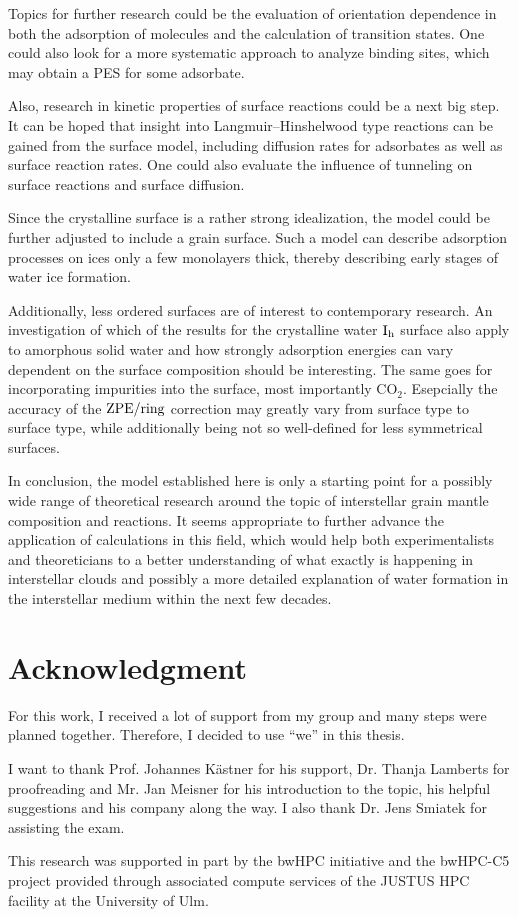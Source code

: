 Topics for further research could be the evaluation of orientation dependence
in both the adsorption of molecules and the calculation of transition states.
One could also look for a more systematic approach to analyze binding sites,
which may obtain a PES for some adsorbate.

Also, research in kinetic properties of surface reactions could be a next big
step. It can be hoped that insight into Langmuir--Hinshelwood type reactions can
be gained from the surface model, including diffusion rates for adsorbates as
well as surface reaction rates. One could also evaluate the influence of
tunneling on surface reactions and surface diffusion.

Since the crystalline surface is a rather strong idealization, the model could
be further adjusted to include a grain surface. Such a model can describe
adsorption processes on ices only a few monolayers thick, thereby describing
early stages of water ice formation.

Additionally, less ordered surfaces are of interest to contemporary research. An
investigation of which of the results for the crystalline water $\text I_\text h$ surface
also apply to amorphous solid water and how strongly adsorption energies can
vary dependent on the surface composition should be interesting. The same goes
for incorporating impurities into the surface, most importantly CO$_2$.
Esepcially the accuracy of the $\text{ZPE}/\text{ring}$ correction may greatly vary from surface type to
surface type, while additionally being not so well-defined for less symmetrical
surfaces.

In conclusion, the model established here is only a starting point for a
possibly wide range of theoretical research around the topic of interstellar
grain mantle composition and reactions. It seems appropriate to further advance
the application of  calculations in this field, which would help
both experimentalists and theoreticians to a better understanding of what
exactly is happening in interstellar clouds and possibly a more detailed
explanation of water formation in the interstellar medium within the next few
decades.

\section*{Acknowledgment}
For this work, I received a lot of support from my group and many steps were
planned together. Therefore, I decided to use ``we'' in this thesis.

I want to thank Prof. Johannes Kästner for his support, Dr. Thanja Lamberts
for proofreading and Mr. Jan Meisner for his introduction to the topic, his
helpful suggestions and his company along the way. I also thank Dr. Jens
Smiatek for assisting the exam.

This research was supported in part by the bwHPC initiative and the bwHPC-C5
project\cite{JUSTUS} provided through associated compute services of the JUSTUS
HPC facility at the University of Ulm.
% 

%
%

%
{}
